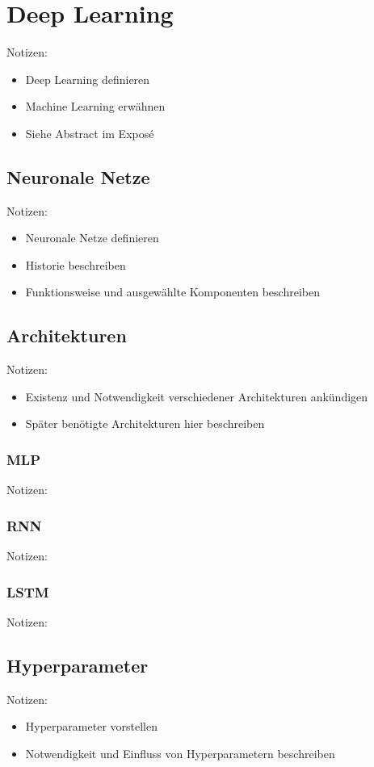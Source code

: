 \chapter{Deep Learning}
\thispagestyle{fancy}
\label{chap:Deep Learning}

Notizen:
\begin{itemize}
	\item Deep Learning definieren
	\item Machine Learning erwähnen
	\item Siehe Abstract im Exposé
\end{itemize}


\section{Neuronale Netze}
Notizen:
\begin{itemize}
	\item Neuronale Netze definieren
	\item Historie beschreiben
	\item Funktionsweise und ausgewählte Komponenten beschreiben
\end{itemize}


\section{Architekturen}
Notizen:
\begin{itemize}
	\item Existenz und Notwendigkeit verschiedener Architekturen ankündigen
	\item Später benötigte Architekturen hier beschreiben
\end{itemize}


\subsection{MLP}
Notizen:


\subsection{RNN}
Notizen:


\subsection{LSTM}
Notizen:


\section{Hyperparameter}
Notizen:
\begin{itemize}
	\item Hyperparameter vorstellen
	\item Notwendigkeit und Einfluss von Hyperparametern beschreiben
\end{itemize}
